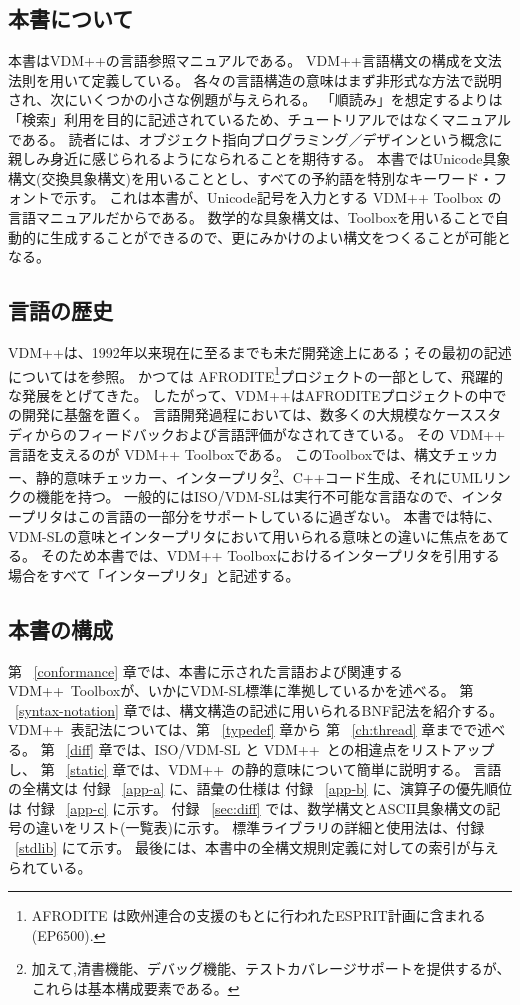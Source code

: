 \documentclass[\pformat,12pt]{jarticle}
\newcommand{\vdmpp}{VDM++}
\begin{document}
\subsection{本書について}

本書は{\vdmpp}の言語参照マニュアルである。
{\vdmpp}言語構文の構成を文法法則を用いて定義している。
各々の言語構造の意味はまず非形式な方法で説明され、次にいくつかの小さな例題が与えられる。
「順読み」を想定するよりは「検索」利用を目的に記述されているため、チュートリアルではなくマニュアルである。
読者には、オブジェクト指向プログラミング／デザインという概念に親しみ身近に感じられるようになられることを期待する。
本書ではUnicode具象構文(交換具象構文)を用いることとし、すべての予約語を特別なキーワード・フォントで示す。
これは本書が、Unicode記号を入力とする {\vdmpp} Toolbox の言語マニュアルだからである。
数学的な具象構文は、Toolboxを用いることで自動的に生成することができるので、更にみかけのよい構文をつくることが可能となる。

\subsection{言語の歴史}

{\vdmpp}は、1992年以来現在に至るまでも未だ開発途上にある；その最初の記述については\cite{Durr92a}を参照。
かつては AFRODITE\footnote{AFRODITE は欧州連合の支援のもとに行われたESPRIT計画に含まれる(EP6500).}プロジェクトの一部として、飛躍的な発展をとげてきた。
したがって、{\vdmpp}はAFRODITEプロジェクトの中での開発に基盤を置く。 
言語開発過程においては、数多くの大規模なケーススタディからのフィードバックおよび言語評価がなされてきている。
その {\vdmpp} 言語を支えるのが  {\vdmpp} Toolboxである。
このToolboxでは、構文チェッカー、静的意味チェッカー、インタープリタ\footnote{加えて,清書機能、デバッグ機能、テストカバレージサポートを提供するが、これらは基本構成要素である。}、C++コード生成、それにUMLリンクの機能を持つ。
一般的にはISO/VDM-SLは実行不可能な言語なので、インタープリタはこの言語の一部分をサポートしているに過ぎない。
本書では特に、VDM-SLの意味とインタープリタにおいて用いられる意味との違いに焦点をあてる。
そのため本書では、{\vdmpp} Toolboxにおけるインタープリタを引用する場合をすべて「インタープリタ」と記述する。

\subsection{本書の構成}

第 ~\ref{conformance} 章では、本書に示された言語および関連する \vdmpp\ Toolboxが、いかにVDM-SL標準に準拠しているかを述べる。
第 ~\ref{syntax-notation} 章では、構文構造の記述に用いられるBNF記法を紹介する。
 \vdmpp\ 表記法については、第 ~\ref{typedef} 章から 第 ~\ref{ch:thread} 章までで述べる。
第 ~\ref{diff} 章では、ISO/VDM-SL と  \vdmpp\ との相違点をリストアップし、
第 ~\ref{static} 章では、\vdmpp\ の静的意味について簡単に説明する。
言語の全構文は 付録 ~\ref{app-a} に、語彙の仕様は 付録 ~\ref{app-b} に、演算子の優先順位は 付録 ~\ref{app-c} に示す。
付録 ~\ref{sec:diff} では、数学構文とASCII具象構文の記号の違いをリスト(一覧表)に示す。
標準ライブラリの詳細と使用法は、付録 ~\ref{stdlib} にて示す。
最後には、本書中の全構文規則定義に対しての索引が与えられている。
\end{document}
